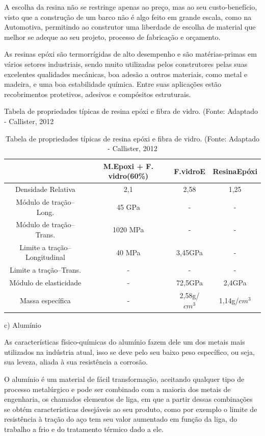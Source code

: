 A escolha da resina não se restringe apenas ao preço, mas ao seu custo-benefício, visto que a construção de um barco não é algo feito em grande escala, como na Automotiva, permitindo ao construtor uma liberdade de escolha de material que melhor se adeque ao seu projeto, processo de fabricação e orçamento.

As resinas epóxi são termorrígidas de alto desempenho e são matérias-primas em vários setores industriais, sendo muito utilizadas pelos construtores pelas suas excelentes qualidades mecânicas, boa adesão a outros materiais, como metal e madeira, e uma boa estabilidade química. Entre suas aplicações estão recobrimentos protetivos, adesivos e compósitos estruturais.

Tabela de propriedades típicas de resina epóxi e fibra de vidro. (Fonte: Adaptado  - Callister, 2012




\begin{table}[h]
	\centering
	\label{compaco}	
	\begin{tabular}{cccc}
		\toprule
		\textbf{ } & \textbf{M.Epoxi  + F. vidro(60\%)} & \textbf{F.vidroE}& \textbf{ResinaEpóxi} \\
		\midrule
Densidade Relativa&2,1&2,58&1,25\\
Módulo de tração–Long.&45 GPa&-&-\\
Módulo de tração–Trans.&1020 MPa&-&-\\
Limite a tração–Longitudinal&40 MPa&3,45GPa&-\\
Limite a tração–Trans.&-&-&-\\
Módulo de elasticidade&-&72,5GPa&2,4GPa\\
Massa específica&-&2,58g/$cm^{3}$ &1,14g/$cm^{3}$\\
		\bottomrule
	\end{tabular}	
	\caption{Tabela de propriedades típicas de resina epóxi e fibra de vidro. (Fonte: Adaptado  - Callister, 2012}
\end{table}


c) Alumínio 

As características físico-químicas do alumínio fazem dele um dos metais mais utilizados na indústria atual, isso se deve pelo seu baixo peso específico, ou seja, sua leveza, aliada à sua resistência a corrosão. 

O alumínio é um material de fácil transformação, aceitando qualquer tipo de processo metalúrgico e pode ser combinado com a maioria dos metais de engenharia, os chamados elementos de liga, em que a partir dessas combinações se obtém características desejáveis ao seu produto, como por exemplo o limite de resistência à tração do aço tem seu valor aumentado em função da liga, do trabalho a frio e do tratamento térmico dado a ele. 






